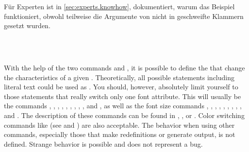 \else %
F\"ur Experten ist in \autoref{sec:experts.knowhow},
 dokumentiert, warum das Beispiel
funktioniert, obwohl teilweise die Argumente von  nicht in
geschweifte Klammern gesetzt wurden.%
\fi
\fi%
%
%
%


\begin{Declaration}
  \\
  \\
\end{Declaration}%
%
%
%
With the help of the two commands  and
, it is possible to define the  that
change the characteristics of a given . Theoretically, all
possible statements including literal text could be used as .
You should, however, absolutely limit yourself to those
statements that really switch only one font attribute. This will usually be
the commands , , ,
, , , ,
, , and , as well as the font size
commands , , , ,
, , , ,
, and . The description of these commands can be
found in \cite{lshort}, \cite{latex:usrguide}, or \cite{latex:fntguide}. Color
switching commands like  (see \cite{package:graphics} and
\cite{package:xcolor}) are also acceptable.  The behavior when using other
commands, especially those that make redefinitions or generate output, is not
defined. Strange behavior is possible and does not represent a bug.

